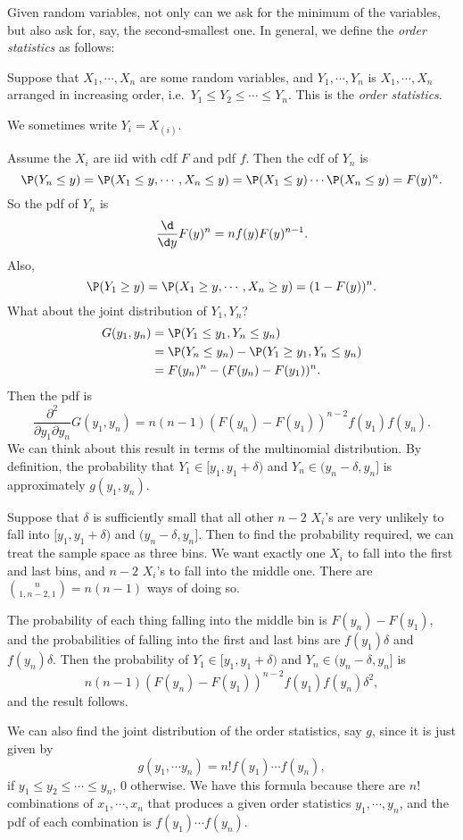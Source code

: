 \documentclass[a4paper]{article}
\begin{document}
Given random variables, not only can we ask for the minimum of the variables, but also ask for, say, the second-smallest one. In general, we define the \emph{order statistics} as follows:
\begin{defi}
  Suppose that $X_1, \cdots, X_n$ are some random variables, and $Y_1, \cdots, Y_n$ is $X_1, \cdots, X_n$ arranged in increasing order, i.e.\ $Y_1 \leq Y_2 \leq \cdots \leq Y_n$. This is the \emph{order statistics}.

  We sometimes write $Y_i = X_{(i)}$.
\end{defi}

Assume the $X_i$ are iid with cdf $F$ and pdf $f$. Then the cdf of $Y_n$ is
\[
  \P(Y_n \leq y) = \P(X_1 \leq y, \cdots, X_n \leq y) = \P(X_1 \leq y)\cdots\P(X_n \leq y) = F(y)^n.
\]
So the pdf of $Y_n$ is
\[
  \frac{\d }{\d y}F(y)^n = nf(y)F(y)^{n - 1}.
\]
Also,
\[
  \P(Y_1 \geq y) = \P(X_1\geq y, \cdots, X_n \geq y) = (1 - F(y))^n.
\]
What about the joint distribution of $Y_1, Y_n$?
\begin{align*}
  G(y_1, y_n) &= \P(Y_1\leq y_1, Y_n \leq y_n)\\
  &= \P(Y_n \leq y_n) - \P(Y_1 \geq y_1 , Y_n \leq y_n)\\
  &= F(y_n)^n - (F(y_n) - F(y_1))^n.
\end{align*}
Then the pdf is
\[
  \frac{\partial^2}{\partial y_1 \partial y_n}G(y_1, y_n) = n(n - 1)(F(y_n) - F(y_1))^{n - 2}f(y_1)f(y_n).
\]
We can think about this result in terms of the multinomial distribution. By definition, the probability that $Y_1\in [y_1, y_1 + \delta)$ and $Y_n\in (y_n - \delta, y_n]$ is approximately $g(y_1, y_n)$.

Suppose that $\delta$ is sufficiently small that all other $n - 2$ $X_i$'s are very unlikely to fall into $[y_1, y_1 + \delta)$ and $(y_n - \delta, y_n]$. Then to find the probability required, we can treat the sample space as three bins. We want exactly one $X_i$ to fall into the first and last bins, and $n - 2$ $X_i$'s to fall into the middle one. There are $\binom{n}{1, n-2, 1} = n(n - 1)$ ways of doing so.

The probability of each thing falling into the middle bin is $F(y_n) - F(y_1)$, and the probabilities of falling into the first and last bins are $f(y_1)\delta$ and $f(y_n)\delta$. Then the probability of $Y_1\in [y_1, y_1 + \delta)$ and $Y_n\in (y_n - \delta, y_n]$ is
\[
  n(n - 1)(F(y_n) - F(y_1))^{n - 2} f(y_1)f(y_n)\delta^2,
\]
and the result follows.

We can also find the joint distribution of the order statistics, say $g$, since it is just given by
\[
  g(y_1, \cdots y_n) = n! f(y_1)\cdots f(y_n),
\]
if $y_1 \leq y_2\leq \cdots \leq y_n$, 0 otherwise. We have this formula because there are $n!$ combinations of $x_1, \cdots, x_n$ that produces a given order statistics $y_1, \cdots, y_n$, and the pdf of each combination is $f(y_1)\cdots f(y_n)$.
\end{document}
